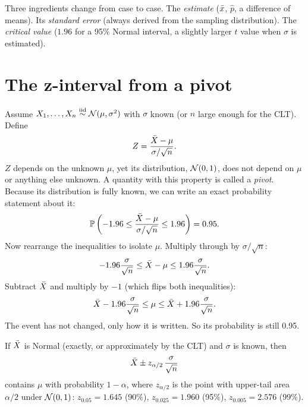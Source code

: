 Three ingredients change from case to case. The \emph{estimate} ($\bar{x}$,
$\hat p$, a difference of means). Its \emph{standard error} (always derived from
the sampling distribution). The \emph{critical value} ($1.96$ for a 95\% Normal
interval, a slightly larger $t$ value when $\sigma$ is estimated).

\section{The z-interval from a pivot}
\label{sec:ci-pivot}

Assume $X_1,\dots,X_n \overset{\text{iid}}{\sim}
\mathcal{N}(\mu,\sigma^2)$ with $\sigma$ known (or $n$ large enough for the CLT).
Define
\[
  Z = \frac{\bar{X} - \mu}{\sigma/\sqrt n}.
\]
$Z$ depends on the unknown $\mu$, yet its distribution, $\mathcal{N}(0,1)$, does
not depend on $\mu$ or anything else unknown. A quantity with this property is
called a \emph{pivot}. Because its distribution is fully known, we can write an
exact probability statement about it:
\[
  \operatorname{\mathbb{P}}\left(-1.96 \le \frac{\bar{X}-\mu}{\sigma/\sqrt n} \le 1.96\right) = 0.95 .
\]
Now rearrange the inequalities to isolate $\mu$. Multiply through by
$\sigma/\sqrt n$:
\[
  -1.96\frac{\sigma}{\sqrt n} \le \bar{X} - \mu \le 1.96\frac{\sigma}{\sqrt n}.
\]
Subtract $\bar{X}$ and multiply by $-1$ (which flips both inequalities):
\[
  \bar{X} - 1.96\frac{\sigma}{\sqrt n} \le \mu \le \bar{X} + 1.96\frac{\sigma}{\sqrt n}.
\]
The event has not changed, only how it is written. So its probability is still
0.95.

\begin{theorem}
If $\bar{X}$ is Normal (exactly, or approximately by the CLT) and $\sigma$ is
known, then
\[
  \bar{X} \pm z_{\alpha/2}\,\frac{\sigma}{\sqrt n}
\]
contains $\mu$ with probability $1-\alpha$, where $z_{\alpha/2}$ is the point
with upper-tail area $\alpha/2$ under $\mathcal{N}(0,1)$: $z_{0.05}=1.645$ (90\%),
$z_{0.025}=1.960$ (95\%), $z_{0.005}=2.576$ (99\%).
\end{theorem}


